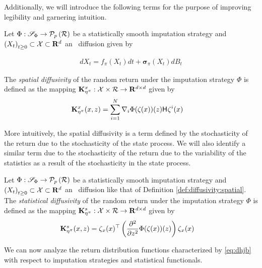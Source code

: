 Additionally, we will introduce the following terms for the purpose of improving
legibility and garnering intuition.

\begin{definition}\label{def:diffusivity:spatial}
  Let $\Phi:\statsdomain{\Phi}\to\probset{\returnspace}$ be a statistically
  smooth imputation
  strategy and $\indexedabove{t}{X}\subset\mathcal{X}\subset\mathbf{R}^d$ an \Ito\ diffusion given by

  \begin{align*}
    dX_t = f_\pi(X_t)dt + \pmb{\sigma}_\pi(X_t)dB_t
  \end{align*}

  The \emph{spatial diffusivity} of the random return under the imputation
  strategy $\Phi$ is defined as the mapping
  $\statediffuse:\mathcal{X}\times\mathcal{R}\to\mathbf{R}^{d\times d}$ given by
  \begin{align*}
    \statediffuse(x,z) &=
    \sum_{i=1}^N\nabla_i\Phi(\statistics(x))(z)\hessian{}\statistics^i(x)
  \end{align*}
\end{definition}

More intuitively, the spatial diffusivity is a term defined by the stochasticity
of the return due to the stochasticity of the state process. We will also
identify a similar term due to the stochasticity of the return due to the
variability of the statistics as a result of the  stochasticity in the state
process.

\begin{definition}\label{def:diffusivity:statistical}
  Let $\Phi:\statsdomain{\Phi}\to\probset{\returnspace}$ be a statistically
  smooth imputation strategy and
  $\indexedabove{t}{X}\subset\mathcal{X}\subset\mathbf{R}^d$ an \Ito\ diffusion
  like that of Definition \ref{def:diffusivity:spatial}. The \emph{statistical
  diffusivity} of the random return under the imputation strategy $\Phi$ is
  defined as the mapping
  $\statsdiffuse:\mathcal{X}\times\returnspace\to\mathbf{R}^{d\times d}$ given
  by
  \begin{align*}
    \statsdiffuse(x,z) &=
    \quadraticform{\statistics{}_x(x)}{\left(\frac{\partial^2}{\partial
    z^2}\Phi(\statistics(x))(z)\right)}
  \end{align*}
\end{definition}

We can now analyze the return distribution functions characterized by
\eqref{eq:dhjb} with respect to imputation strategies and statistical
functionals.

